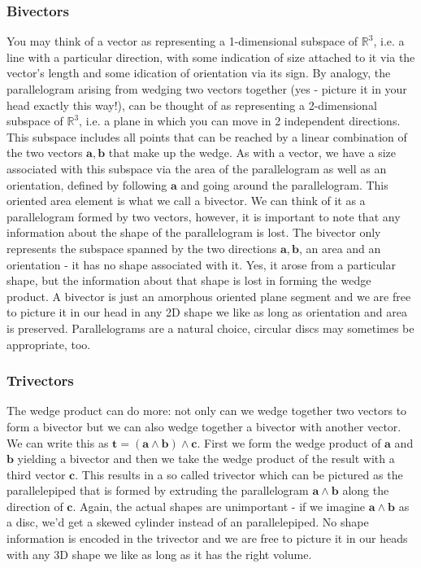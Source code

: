 \subsubsection{Bivectors}
You may think of a vector as representing a 1-dimensional subspace of $\mathbb{R}^3$, i.e. a line with a particular direction, with some indication of size attached to it via the vector's length and some idication of orientation via its sign. By analogy, the parallelogram arising from wedging two vectors together (yes - picture it in your head exactly this way!), can be thought of as representing a 2-dimensional subspace of $\mathbb{R}^3$, i.e. a plane in which you can move in 2 independent directions. This subspace includes all points that can be reached by a linear combination of the two vectors $\mathbf{a,b}$ that make up the wedge. As with a vector, we have a size associated with this subspace via the area of the parallelogram as well as an orientation, defined by following $\mathbf{a}$ and going around the parallelogram. This oriented area element is what we call a bivector. We can think of it as a parallelogram formed by two vectors, however, it is important to note that any information about the shape of the parallelogram is lost. The bivector only represents the subspace spanned by the two directions $\mathbf{a,b}$, an area and an orientation - it has no shape associated with it. Yes, it arose from a particular shape, but the information about that shape is lost in forming the wedge product. A bivector is just an amorphous oriented plane segment and we are free to picture it in our head in any 2D shape we like as long as orientation and area is preserved. Parallelograms are a natural choice, circular discs may sometimes be appropriate, too.

\subsubsection{Trivectors}
The wedge product can do more: not only can we wedge together two vectors to form a bivector but we can also wedge together a bivector with another vector. We can write this as $\mathbf{t = (a \wedge b) \wedge c}$. First we form the wedge product of $\mathbf{a}$ and  $\mathbf{b}$ yielding a bivector and then we take the wedge product of the result with a third vector $\mathbf{c}$. This results in a so called trivector which can be pictured as the parallelepiped that is formed by extruding the parallelogram $\mathbf{a \wedge b}$ along the direction of $\mathbf{c}$. Again, the actual shapes are unimportant - if we imagine $\mathbf{a \wedge b}$ as a disc, we'd get a skewed cylinder instead of an parallelepiped. No shape information is encoded in the trivector and we are free to picture it in our heads with any 3D shape we like as long as it has the right volume.


